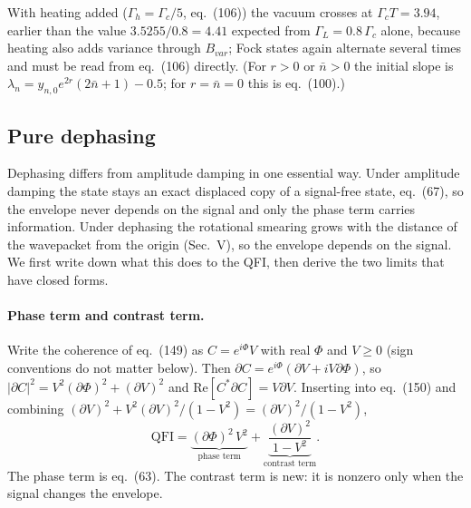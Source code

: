 With heating added ($\Gamma_h = \Gamma_c/5$, eq.~(106)) the vacuum crosses at $\Gamma_c T = 3.94$, earlier than the value $3.5255/0.8 = 4.41$ expected from $\Gamma_L = 0.8\,\Gamma_c$ alone, because heating also adds variance through $B_{var}$; Fock states again alternate several times and must be read from eq.~(106) directly. (For $r > 0$ or $\bar{n} > 0$ the initial slope is $\lambda_n = y_{n,0}e^{2r}(2\bar{n}+1) - 0.5$; for $r = \bar{n} = 0$ this is eq.~(100).)

\subsection{Pure dephasing}
\label{sec:rep-dephasing}

Dephasing differs from amplitude damping in one essential way. Under amplitude damping the state stays an exact displaced copy of a signal-free state, eq.~(67), so the envelope never depends on the signal and only the phase term carries information. Under dephasing the rotational smearing grows with the distance of the wavepacket from the origin (Sec.~V), so the envelope depends on the signal. We first write down what this does to the QFI, then derive the two limits that have closed forms.

\paragraph{Phase term and contrast term.} Write the coherence of eq.~(149) as $C = e^{i\Phi}V$ with real $\Phi$ and $V \ge 0$ (sign conventions do not matter below). Then $\partial C = e^{i\Phi}(\partial V + iV\partial\Phi)$, so $\vert\partial C\vert^2 = V^2(\partial\Phi)^2 + (\partial V)^2$ and $\mathrm{Re}[C^*\partial C] = V\partial V$. Inserting into eq.~(150) and combining $(\partial V)^2 + V^2(\partial V)^2/(1 - V^2) = (\partial V)^2/(1 - V^2)$,
\begin{equation}
\label{eq:R-contrast}
    \mathrm{QFI} = \underbrace{(\partial\Phi)^2\,V^2}_{\text{phase term}} + \underbrace{\frac{(\partial V)^2}{1 - V^2}}_{\text{contrast term}} .
\end{equation}
The phase term is eq.~(63). The contrast term is new: it is nonzero only when the signal changes the envelope.


